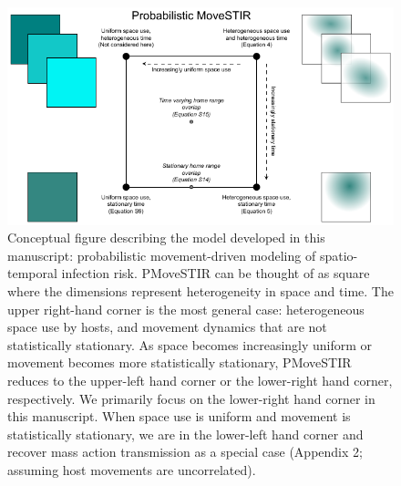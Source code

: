 \documentclass[letterpaper]{article}
\begin{document}
\begin{figure}
    \includegraphics[width=\textwidth]{figures/conceptual_figure_pmovestir_mod.pdf}
    \caption{Conceptual figure describing the model developed in this manuscript: probabilistic movement-driven modeling of spatio-temporal infection risk. PMoveSTIR can be thought of as square where the dimensions represent heterogeneity in space and time. The upper right-hand corner is the most general case: heterogeneous space use by hosts, and movement dynamics that are not statistically stationary.  As space becomes increasingly uniform or movement becomes more statistically stationary, PMoveSTIR reduces to the upper-left hand corner or the lower-right hand corner, respectively.  We primarily focus on the lower-right hand corner in this manuscript.  When space use is uniform and movement is statistically stationary, we are in the lower-left hand corner and recover mass action transmission as a special case (Appendix 2; assuming host movements are uncorrelated).}
	\label{fig:square}
\end{figure}
\end{document}
